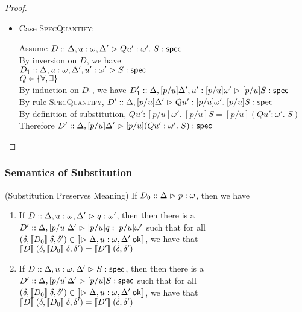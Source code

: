 \begin{proof}
\begin{enumerate}
\begin{itemize}
    \item Case \textsc{SpecQuantify}:
      \begin{tabbedproof}
        \oo Assume $D :: \judgeS[{\Delta, u:\omega, \Delta'}]{Q u':\omega'.\; S}$ \\
        \ooo By inversion on $D$, we have \\
        \oooo $D_1 :: \judgeS[{\Delta, u:\omega, \Delta', u':\omega'}]{S}$ \\
        \oooo $Q \in \setof{\forall, \exists}$ \\
        \ooo By induction on $D_1$, we have $D'_1 :: \judgeS[{\Delta, [p/u]\Delta', u':[p/u]\omega'}]{[p/u]S}$ \\
        \ooo By rule \textsc{SpecQuantify}, 
              $D' :: \judgeS[{\Delta, [p/u]\Delta'}]{Q u':[p/u]\omega'.\; [p/u]S}$ \\
        \ooo By definition of substitution, $Q u':[p/u]\omega'.\; [p/u]S = [p/u](Q u':\omega'.\; S)$ \\
        \ooo Therefore $D' :: \judgeS[{\Delta, [p/u]\Delta'}]{[p/u](Q u':\omega'.\; S)}$ \\
      \end{tabbedproof}
    \end{itemize}
  \end{enumerate}
\end{proof}
  
\subsubsection{Semantics of Substitution}

\begin{lemma}{(Substitution Preserves Meaning)}
If $D_0 :: \judgeA{p}{\omega}$, then we have 

\begin{enumerate}
\item If $D :: \judgeA[{\Delta, u:\omega, \Delta'}]{q}{\omega'}$, then
  then there is a $D' :: \judgeA[{\Delta, [p/u]\Delta'}]{[p/u]q}{[p/u]\omega'}$ such
  that for all $(\delta, \interp{D_0}\;\delta, \delta') \in 
                \interp{\judgeACtx{\Delta, u:\omega, \Delta'}}$, 
  we have that $\interp{D}\;(\delta, \interp{D_0}\;\delta, \delta') = \interp{D'}\;(\delta, \delta')$ 

\item If $D :: \judgeS[{\Delta, u:\omega, \Delta'}]{S}$, then
  then there is a $D' :: \judgeS[{\Delta, [p/u]\Delta'}]{[p/u]S}$ such
  that for all $(\delta, \interp{D_0}\;\delta, \delta') \in 
                \interp{\judgeACtx{\Delta, u:\omega, \Delta'}}$, 
  we have that $\interp{D}\;(\delta, \interp{D_0}\;\delta, \delta') = \interp{D'}\;(\delta, \delta')$ 
\end{enumerate}
\end{lemma}

